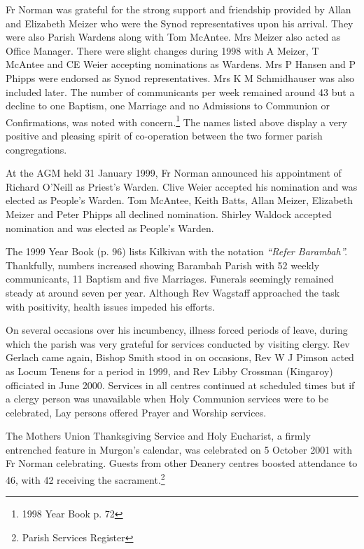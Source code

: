 Fr Norman was grateful for the strong support and friendship provided by Allan and Elizabeth Meizer who were the Synod representatives upon his arrival. They were also Parish Wardens along with Tom McAntee. Mrs Meizer also acted as Office Manager. There were slight changes during 1998 with A Meizer, T McAntee and CE Weier accepting nominations as Wardens. Mrs P Hansen and P Phipps were endorsed as Synod representatives. Mrs K M Schmidhauser was also included later. The number of communicants per week remained around 43 but a decline to one Baptism, one Marriage and no Admissions to Communion or Confirmations, was noted with concern.\footnote{1998 Year Book p. 72} The names listed above display a very positive and pleasing spirit of co-operation between the two former parish congregations.


At the AGM held 31 January 1999, Fr Norman announced his appointment of Richard O'Neill as Priest's Warden. Clive Weier accepted his nomination and was elected as People's Warden. Tom McAntee, Keith Batts, Allan Meizer, Elizabeth Meizer and Peter Phipps all declined nomination. Shirley Waldock accepted nomination and was elected as People's Warden.



The 1999 Year Book (p. 96) lists Kilkivan with the notation \emph{``Refer Barambah''.} Thankfully, numbers increased showing Barambah Parish with 52 weekly communicants, 11 Baptism and five Marriages. Funerals seemingly remained steady at around seven per year. Although Rev Wagstaff approached the task with positivity, health issues impeded his efforts.



On several occasions over his incumbency, illness forced periods of leave, during which the parish was very grateful for services conducted by visiting clergy. Rev Gerlach came again, Bishop Smith stood in on occasions, Rev W J Pimson acted as Locum Tenens for a period in 1999, and Rev Libby Crossman (Kingaroy) officiated in June 2000. Services in all centres continued at scheduled times but if a clergy person was unavailable when Holy Communion services were to be celebrated, Lay persons offered Prayer and Worship services.



The Mothers Union Thanksgiving Service and Holy Eucharist, a firmly entrenched feature in Murgon's calendar, was celebrated on 5 October 2001 with Fr Norman celebrating. Guests from other Deanery centres boosted attendance to 46, with 42 receiving the sacrament.\footnote{Parish Services Register}


